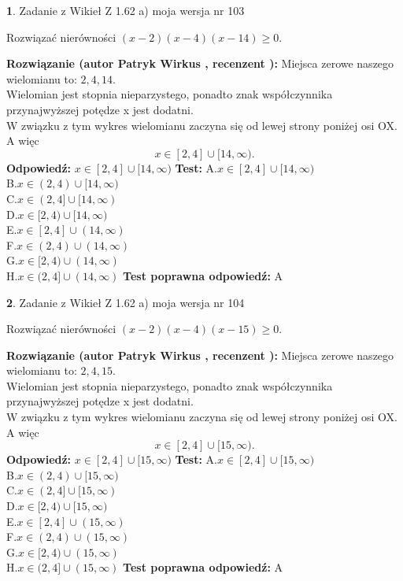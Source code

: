 \documentclass[12pt, a4paper]{article}
\theoremstyle{definition} %
\newtheorem{zad}{}
\newcommand{\zadStart}[1]{\begin{zad}#1\newline}
\newcommand{\zadStop}{\end{zad}}
\newcommand{\rozwStart}[2]{\noindent \textbf{Rozwiązanie (autor #1 , recenzent #2): }\newline}
\newcommand{\rozwStop}{\newline}
\newcommand{\odpStart}{\noindent \textbf{Odpowiedź:}\newline}
\newcommand{\odpStop}{\newline}
\newcommand{\testStart}{\noindent \textbf{Test:}\newline}
\newcommand{\testStop}{\newline}
\newcommand{\kluczStart}{\noindent \textbf{Test poprawna odpowiedź:}\newline}
\newcommand{\kluczStop}{\newline}
\begin{document}
\zadStart{Zadanie z Wikieł Z 1.62 a) moja wersja nr 103}

Rozwiązać nierówności $(x-2)(x-4)(x-14)\ge0$.
\zadStop
\rozwStart{Patryk Wirkus}{}
Miejsca zerowe naszego wielomianu to: $2, 4, 14$.\\
Wielomian jest stopnia nieparzystego, ponadto znak współczynnika przy\linebreak najwyższej potędze x jest dodatni.\\ W związku z tym wykres wielomianu zaczyna się od lewej strony poniżej osi OX. A więc $$x \in [2,4] \cup [14,\infty).$$
\rozwStop
\odpStart
$x \in [2,4] \cup [14,\infty)$
\odpStop
\testStart
A.$x \in [2,4] \cup [14,\infty)$\\
B.$x \in (2,4) \cup [14,\infty)$\\
C.$x \in (2,4] \cup [14,\infty)$\\
D.$x \in [2,4) \cup [14,\infty)$\\
E.$x \in [2,4] \cup (14,\infty)$\\
F.$x \in (2,4) \cup (14,\infty)$\\
G.$x \in [2,4) \cup (14,\infty)$\\
H.$x \in (2,4] \cup (14,\infty)$
\testStop
\kluczStart
A
\kluczStop



\zadStart{Zadanie z Wikieł Z 1.62 a) moja wersja nr 104}

Rozwiązać nierówności $(x-2)(x-4)(x-15)\ge0$.
\zadStop
\rozwStart{Patryk Wirkus}{}
Miejsca zerowe naszego wielomianu to: $2, 4, 15$.\\
Wielomian jest stopnia nieparzystego, ponadto znak współczynnika przy\linebreak najwyższej potędze x jest dodatni.\\ W związku z tym wykres wielomianu zaczyna się od lewej strony poniżej osi OX. A więc $$x \in [2,4] \cup [15,\infty).$$
\rozwStop
\odpStart
$x \in [2,4] \cup [15,\infty)$
\odpStop
\testStart
A.$x \in [2,4] \cup [15,\infty)$\\
B.$x \in (2,4) \cup [15,\infty)$\\
C.$x \in (2,4] \cup [15,\infty)$\\
D.$x \in [2,4) \cup [15,\infty)$\\
E.$x \in [2,4] \cup (15,\infty)$\\
F.$x \in (2,4) \cup (15,\infty)$\\
G.$x \in [2,4) \cup (15,\infty)$\\
H.$x \in (2,4] \cup (15,\infty)$
\testStop
\kluczStart
A
\kluczStop
\end{document}
